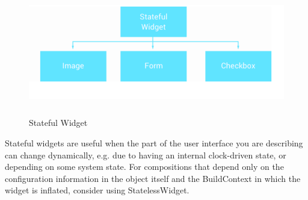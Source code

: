 \begin{figure}[h]
  \begin{center}
 \includegraphics[height=55mm]{Images & Logos/CH_03_STATEFUL.png}
  \end{center}
  \caption{Stateful Widget}
\end{figure}  
Stateful widgets are useful when the part of the user interface you are describing can change dynamically, e.g. due to having an internal clock-driven state, or depending on some system state. For compositions that depend only on the configuration information in the object itself and the BuildContext in which the widget is inflated, consider using StatelessWidget.\\
